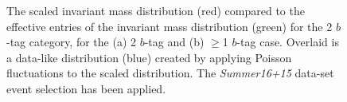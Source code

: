 \begin{figure}[!ht]
  \begin{center}
   \captionsetup[subfigure]{aboveskip=0pt,justification=centering}
  \end{center}
  \caption{The scaled invariant mass distribution (red) compared to the
    effective entries of the invariant mass distribution (green) for the 2 $b$-tag category,
    for the (a) 2 $b$-tag and (b) $\geq$1 $b$-tag case.
    Overlaid is a data-like distribution (blue) created by applying Poisson fluctuations to the scaled distribution.
    The \textit{Summer16+15} data-set event selection has been applied.}
  \label{fig:effEntDataLike}
\end{figure}

